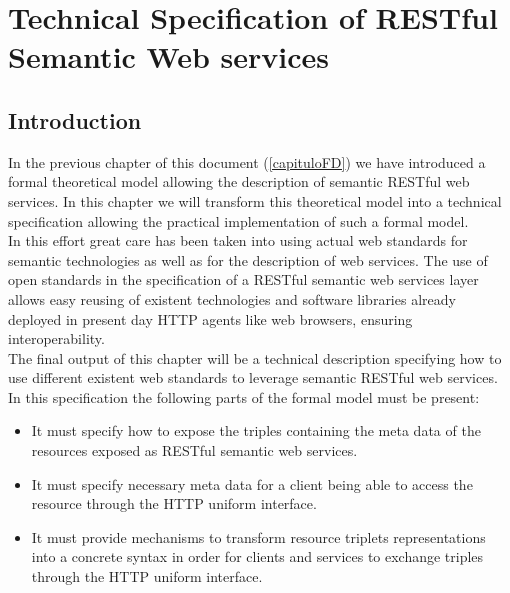 \chapter{Technical Specification of RESTful Semantic Web services }\label{capituloTS}

\section{Introduction}

In the previous chapter of this document (\ref{capituloFD}) we have introduced a formal theoretical model allowing the description of
semantic RESTful web services. In this chapter we will transform this theoretical model into a technical specification
allowing the practical implementation of such a formal model.\\
In this effort great care has been taken into using actual web standards for semantic technologies as well as for the
description of web services. The use of open standards in the specification of a RESTful semantic web services layer
allows easy reusing of existent technologies and software libraries already deployed in present day HTTP agents like web
browsers, ensuring interoperability.\\
The final output of this chapter will be a technical description specifying  how to use different existent web standards to
leverage semantic RESTful web services.  In this specification  the following parts of the formal model
must be present:
\begin{itemize}
\item It must specify how to expose the triples containing the meta data of the resources exposed as RESTful
  semantic web services.
\item It must specify necessary meta data for a client being able to access the resource through the HTTP uniform
  interface.
\item It must provide mechanisms to transform resource triplets representations into a concrete syntax in order for clients and
  services to exchange triples through the HTTP uniform interface.
\end{itemize}

